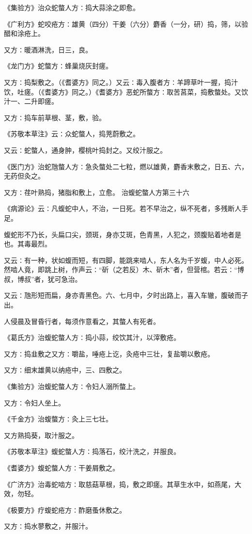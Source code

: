 \documentclass[a4paper,12pt,UTF8,twoside]{ctexbook}
\begin{document}
《集验方》治众蛇螫人方∶捣大蒜涂之即愈。

《广利方》蛇咬疮方∶雄黄（四分）干姜（六分）麝香（一分，研）捣，筛，以验醋和涂疮上。

又方∶暖酒淋洗，日三，良。

《龙门方》蛇螫方∶蜂巢烧灰封瘥。

又方∶捣梨敷之。（《耆婆方》同之。）又云∶毒入腹者方∶羊蹄草叶一握，捣汁饮，吐瘥。（《耆婆方》同之。）《耆婆方》恶蛇所螫方∶取苦莒菜，捣敷螫处。又饮汁一、二升即瘥。

又方∶捣车前草根、茎，敷，验。

《苏敬本草注》云∶众蛇螫人，捣茺蔚敷之。

又云∶蛇螫人，通身肿，樱桃叶捣封之。又绞汁服之。

《医门方》治蛇虺螫人方∶急灸螫处二七粒，燃以雄黄，麝香末敷之，日五、六，无药但灸之。

又方∶荏叶熟捣，猪脂和敷上，立愈。
治蝮蛇螫人方第三十六

《病源论》云∶凡蝮蛇中人，不治，一日死。若不早治之，纵不死者，多残断人手足。

蝮蛇形不乃长，头扁口尖，颈斑，身亦艾斑，色青黑，人犯之，颈腹贴着地者是也。其毒最烈。

又云∶有一种，状如蝮而短，有四脚，能跳来啮人，东人名为千岁蝮，中人必死。然啮人竟，即跳上树，作声云∶“斫（之若反）木、斫木”者，但营棺。若云∶“博叔，博叔”者，犹可急治。

又云∶虺形短而扁，身亦青黑色。六、七月中，夕时出路上，喜入车辙，腹破而子出。

人侵晨及冒昏行者，每须作意看之，其螫人有死者。

《葛氏方》治蝮蛇螫人方∶捣小蒜，绞饮其汁，以滓敷疮。

又方∶捣韭敷之又方∶嚼盐，唾疮上讫，灸疮中三壮，复盐嚼以敷疮。

又方∶细末雄黄以纳疮中，三、四敷之。

《集验方》治蝮蛇螫人方∶令妇人溺所螫上。

又方∶令妇人坐上。

《千金方》治蝮螫方∶灸上三七壮。

又方熟捣葵，取汁服之。

《苏敬本草注》蝮蛇螫人方∶捣落石，绞汁洗之，并服良。

《耆婆方》蝮蛇螫人方∶干姜屑敷之。

《广济方》治毒蛇啮方∶取慈菇草根，捣，敷之即瘥。其草生水中，如燕尾，大效，勿轻。

《极要方》疗蝮蛇疮方∶酢磨蚤休敷之。

又方∶捣水蓼敷之，并服汁。
\end{document}
